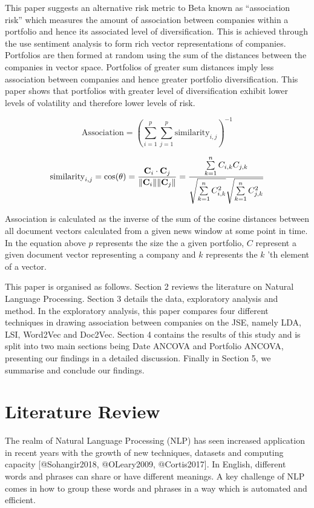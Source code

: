 \documentclass[11pt]{article}
\begin{document}
This paper suggests an alternative risk metric to Beta known as
``association risk'' which measures the amount of association between
companies within a portfolio and hence its associated level of
diversification. This is achieved through the use sentiment analysis to
form rich vector representations of companies. Portfolios are then
formed at random using the sum of the distances between the companies in
vector space. Portfolios of greater sum distances imply less association
between companies and hence greater portfolio diversification. This
paper shows that portfolios with greater level of diversification
exhibit lower levels of volatility and therefore lower levels of risk.

\[\text{Association}=(\sum_{i=1}^{p} \sum_{j=1}^{p} \text{similarity}_{i,j})^{-1}\]

\[\text{similarity}_{i,j} = \cos(\theta) = {\mathbf{C}_{i} \cdot \mathbf{C}_{j} \over \|\mathbf{C}_{i}\| \|\mathbf{C}_{j}\|} = \frac{ \sum\limits_{k=1}^{n}{C_{i,k}  C_{j,k}} }{ \sqrt{\sum\limits_{k=1}^{n}{C_{i,k}^2}}  \sqrt{\sum\limits_{k=1}^{n}{C_{j,k}^2}} }\]

Association is calculated as the inverse of the sum of the cosine
distances between all document vectors calculated from a given news
window at some point in time. In the equation above \(p\) represents the
size the a given portfolio, \(C\) represent a given document vector
representing a company and \(k\) represents the \(k\) 'th element of a
vector.

This paper is organised as follows. Section 2 reviews the literature on
Natural Language Processing. Section 3 details the data, exploratory
analysis and method. In the exploratory analysis, this paper compares
four different techniques in drawing association between companies on
the JSE, namely LDA, LSI, Word2Vec and Doc2Vec. Section 4 contains the
results of this study and is split into two main sections being Date
ANCOVA and Portfolio ANCOVA, presenting our findings in a detailed
discussion. Finally in Section 5, we summarise and conclude our
findings.

\hypertarget{literature-review}{%
\section{Literature Review}\label{literature-review}}

The realm of Natural Language Processing (NLP) has seen increased
application in recent years with the growth of new techniques, datasets
and computing capacity {[}@Sohangir2018, @OLeary2009, @Cortis2017{]}. In
English, different words and phrases can share or have different
meanings. A key challenge of NLP comes in how to group these words and
phrases in a way which is automated and efficient.
\end{document}
